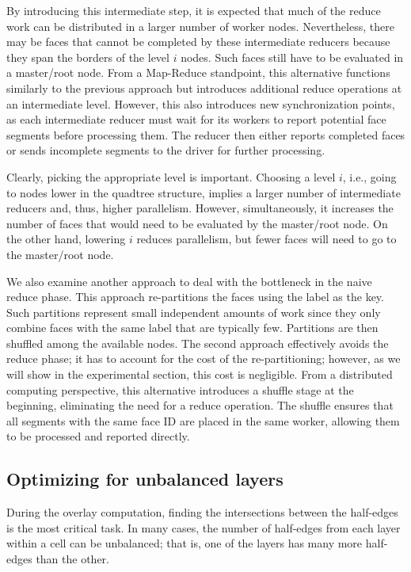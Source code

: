 By introducing this intermediate step, it is expected that much of the reduce work can be distributed in a larger number of worker nodes. Nevertheless, there may be faces that cannot be completed by these intermediate reducers because they span the borders of the level $i$ nodes. Such faces still have to be evaluated in a master/root node.
From a Map-Reduce standpoint, this alternative functions similarly to the previous approach but introduces additional reduce operations at an intermediate level. However, this also introduces new synchronization points, as each intermediate reducer must wait for its workers to report potential face segments before processing them. The reducer then either reports completed faces or sends incomplete segments to the driver for further processing.

Clearly, picking the appropriate level is important. Choosing a level $i$, i.e., going to nodes lower in the quadtree structure, implies a larger number of intermediate reducers and, thus, higher parallelism. However, simultaneously, it increases the number of faces that would need to be evaluated by the master/root node. On the other hand, lowering $i$ reduces parallelism, but fewer faces will need to go to the master/root node.

We also examine another approach to deal with the bottleneck in the naive reduce phase. This approach re-partitions the faces using the label as the key. Such partitions represent small independent amounts of work since they only combine faces with the same label that are typically few. Partitions are then shuffled among the available nodes. The second approach effectively avoids the reduce phase; it has to account for the cost of the re-partitioning; however, as we will show in the experimental section, this cost is negligible.
From a distributed computing perspective, this alternative introduces a shuffle stage at the beginning, eliminating the need for a reduce operation. The shuffle ensures that all segments with the same face ID are placed in the same worker, allowing them to be processed and reported directly.

\subsection{Optimizing for unbalanced layers}\label{sec:unbalance}
During the overlay computation, finding the intersections between the half-edges is the most critical task. In many cases, the number of half-edges from each layer within a cell can be unbalanced; that is, one of the layers has many more half-edges than the other.


